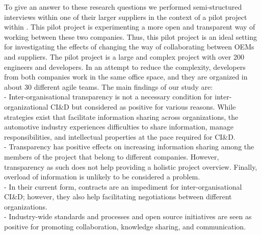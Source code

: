 To give an answer to these research questions we performed semi-structured interviews within  
one of their larger suppliers in the context of a pilot project within \company{}. %
This pilot project is experimenting a more open and transparent way of working between these two companies. Thus, this pilot project is an ideal setting for investigating the effects of changing the way of collaborating between OEMs and suppliers.  
The pilot project is a large and complex project with over 200 engineers and developers. 
In an attempt to reduce the complexity, developers from both companies work in the same office space, and they are organized in about 30 different agile teams. %
The main findings of our study are:\\
{} - Inter-organisational transparency is not a necessary condition for inter-organizational CI\&D but considered as positive for various reasons. %
While strategies exist that facilitate information sharing  across organizations, the automotive industry experiences difficulties to share information, manage responsibilities, and intellectual properties at the pace required for CI\&D.\\ %
{} - Transparency has positive effects on increasing information sharing among the members of the project that belong to different companies. However, transparency as such does not help providing a holistic project overview. Finally, overload of information is unlikely to be considered a problem.\\
{} - In their current form, contracts are an impediment for inter-or\-ga\-nisational CI\&D; however, they also help facilitating negotiations between different organizations. \\
{} - Industry-wide standards and processes and open source initiatives are seen as positive for promoting collaboration, knowledge sharing, and communication.

